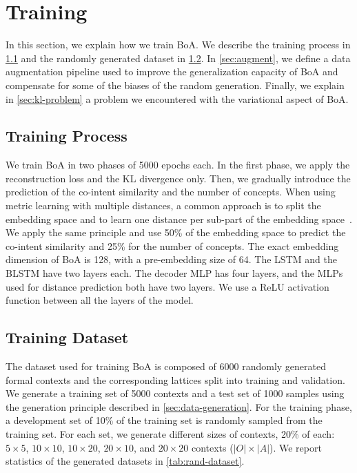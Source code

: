 
\section{Training\label{sec:boa-training}}
In this section, we explain how we train BoA.
We describe the training process in \cref{sec:boa-training-process} and the randomly generated dataset in \cref{sec:boa-training-data}. In \cref{sec:augment}, we define a data augmentation pipeline used to improve the generalization capacity of BoA and compensate for some of the biases of the random generation. Finally, we explain in \cref{sec:kl-problem} a problem we encountered with the variational aspect of BoA.

\subsection{Training Process}\label{sec:boa-training-process}
We train BoA in two phases of 5000 epochs each.
In the first phase, we apply the reconstruction loss and the KL divergence only.
Then, we gradually introduce the prediction of the co-intent similarity and the number of concepts.
%
When using metric learning with multiple distances, a common approach is to split the embedding space and to learn one distance per sub-part of the embedding space~\cite{deep-metric-multispeaker:2020:kulkarni}.
We apply the same principle and use 50\% of the embedding space to predict the co-intent similarity and 25\% for the number of concepts.
%
The exact embedding dimension of BoA is 128, with a pre-embedding size of 64.
The LSTM and the BLSTM have two layers each.
The decoder MLP has four layers, and the MLPs used for distance prediction both have two layers.
We use a ReLU activation function between all the layers of the model.

\subsection{Training Dataset}\label{sec:boa-training-data}
The dataset used for training BoA is composed of 6000 randomly generated formal contexts and the corresponding lattices split into training and validation.
We generate a training set of 5000 contexts and a test set of 1000 samples using the generation principle described in \cref{sec:data-generation}.
For the training phase, a development set of 10\% of the training set is randomly sampled from the training set. 
For each set, we generate different sizes of contexts, 20\% of each: $5 \times 5$, $10 \times 10$, $10 \times 20$, $20 \times 10$, and $20 \times 20$ contexts ($|O|\times|A|$).
We report statistics of the generated datasets in \cref{tab:rand-dataset}.

